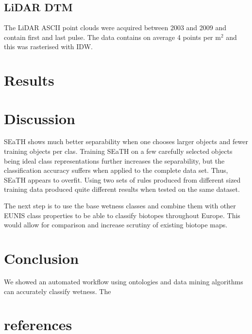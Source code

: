 \documentclass[authoryear, review,12pt,number]{elsarticle}
\begin{document}
\subsection{LiDAR DTM}
The LiDAR ASCII point clouds were acquired between 2003 and 2009 and contain
first and last pulse. The data contains on average 4 points per m$^{2}$ and
this was rasterised with IDW.

\section{Results}

\section{Discussion}
SEaTH shows much better separability when one chooses larger objects and fewer
training objects per clas. Training SEaTH on a few carefully selected objects
being ideal class representations further increases the separability, but the classification
accuracy suffers when applied to the complete data set. Thus, SEaTH appears to
overfit. Using two sets of rules produced from different sized training data
produced quite different results when tested on the same dataset.

The next step is to use the base wetness classes and combine them with other
EUNIS class properties to be able to classify biotopes throughout Europe. This
would allow for comparison and increase scrutiny of existing biotope maps.

\section{Conclusion}
We showed an automated workflow using ontologies and data mining algorithms can
accurately classify wetness. The

\section{references}

\end{document}
